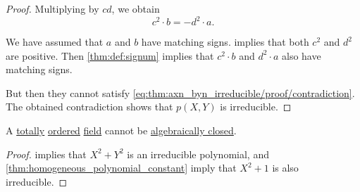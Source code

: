 \begin{proof}
  Multiplying by \( cd \), we obtain
  \begin{equation}\label{eq:thm:axn_byn_irreducible/proof/contradiction}
    c^2 \cdot b = - d^2 \cdot a.
  \end{equation}

  We have assumed that \( a \) and \( b \) have matching signs.  implies that both \( c^2 \) and \( d^2 \) are positive. Then \cref{thm:def:signum} implies that \( c^2 \cdot b \) and \( d^2 \cdot a \) also have matching signs.

  But then they cannot satisfy \eqref{eq:thm:axn_byn_irreducible/proof/contradiction}. The obtained contradiction shows that \( p(X, Y) \) is irreducible.
\end{proof}

\begin{corollary}\label{thm:ordered_field_not_algebraically_closed}
  A \hyperref[def:totally_ordered_set]{totally} \hyperref[def:ordered_semiring]{ordered} \hyperref[def:field]{field} cannot be \hyperref[def:algebraically_closed_field]{algebraically closed}.
\end{corollary}
\begin{proof}
   implies that \( X^2 + Y^2 \) is an irreducible polynomial, and \cref{thm:homogeneous_polynomial_constant} imply that \( X^2 + 1 \) is also irreducible.
\end{proof}

